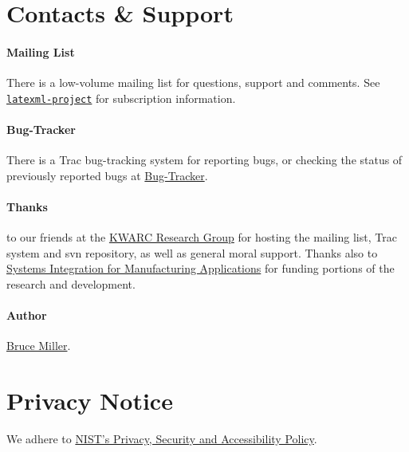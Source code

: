 \documentclass{article}
\begin{document}

\section{Contacts \& Support}\label{contact}

\paragraph{Mailing List}
There is a low-volume mailing list for questions, support and comments.
See \href{http://lists.jacobs-university.de/mailman/listinfo/project-latexml}{\texttt{latexml-project}} for subscription information.


\paragraph{Bug-Tracker}
  There is a Trac bug-tracking system for reporting bugs, or checking the
  status of previously reported bugs at
 \href{https://trac.mathweb.org/LaTeXML/}{Bug-Tracker}.


\paragraph{Thanks} to our friends at
the \href{http://kwarc.info}{KWARC Research Group}
for hosting the mailing list, Trac system and svn repository,
as well as general moral support.
Thanks also to \href{http://nist.gov/sima}{Systems Integration for Manufacturing Applications}
for funding portions of the research and development.

\paragraph{Author} \href{mailto:bruce.miller@nist.gov}{Bruce Miller}.
\section{Privacy Notice}\label{privacy}
We adhere to \href{http://www.nist.gov/public_affairs/privacy.htm}{NIST's Privacy, Security and Accessibility Policy}.
\end{document}
